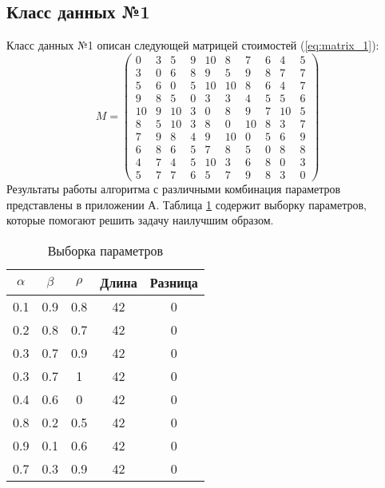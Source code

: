 \subsection{Класс данных №1}
Класс данных №1 описан следующей матрицей стоимостей (\ref{eq:matrix_1}):
\begin{equation}
	\label{eq:matrix_1}
	M = \begin{pmatrix}
		0  & 3 & 5  & 9 & 10 & 8  & 7  & 6 & 4  & 5 \\
		3  & 0 & 6  & 8 & 9  & 5  & 9  & 8 & 7  & 7 \\
		5  & 6 & 0  & 5 & 10 & 10 & 8  & 6 & 4  & 7 \\
		9  & 8 & 5  & 0 & 3  & 3  & 4  & 5 & 5  & 6 \\
		10 & 9 & 10 & 3 & 0  & 8  & 9  & 7 & 10 & 5 \\
		8  & 5 & 10 & 3 & 8  & 0  & 10 & 8 & 3  & 7 \\
		7  & 9 & 8  & 4 & 9  & 10 & 0  & 5 & 6  & 9 \\
		6  & 8 & 6  & 5 & 7  & 8  & 5  & 0 & 8  & 8 \\
		4  & 7 & 4  & 5 & 10 & 3  & 6  & 8 & 0  & 3 \\ 
		5  & 7 & 7  & 6 & 5  & 7  & 9  & 8 & 3  & 0
	\end{pmatrix}
\end{equation}
Результаты работы алгоритма с различными комбинация параметров представлены в приложении А. Таблица \ref{table:result_1} содержит выборку параметров, которые помогают решить задачу наилучшим образом.

\begin{table}[ht!]
	\centering
	\captionsetup{singlelinecheck = false, justification=raggedright}
	\caption{Выборка параметров}
	\label{table:result_1}
	\begin{tabular}{|c|c|c|c|c|}
		\hline	
		$\alpha$        & $\beta$      & $\rho$      &Длина  & Разница \\
		\hline
		0.1  & 0.9  & 0.8  & 42    & 0     \\
		0.2  & 0.8  & 0.7  & 42    & 0     \\
		0.3  & 0.7  & 0.9  & 42    & 0     \\
		0.3  & 0.7  & 1    & 42    & 0     \\
		0.4  & 0.6  & 0    & 42    & 0     \\
		0.8  & 0.2  & 0.5  & 42    & 0     \\
		0.9  & 0.1  & 0.6  & 42    & 0     \\
		0.7  & 0.3  & 0.9  & 42    & 0     \\
		\hline
	\end{tabular}
\end{table}

